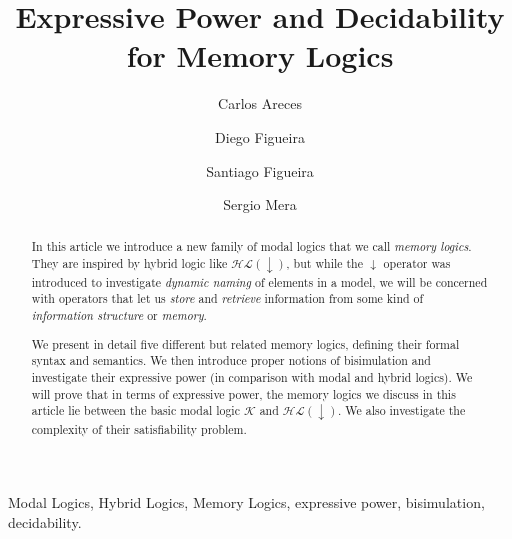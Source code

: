 \documentclass{elsarticle}
\newcommand{\down}{{\downarrow}}
\newcommand{\bml}{\K}
\newcommand{\HL}{\mathcal{HL}}
\newcommand{\K}{\mathcal{K}}
\begin{document}
\begin{frontmatter}
\title{Expressive Power and Decidability for Memory Logics}

\author[LORIA]       {Carlos Areces}
\author[CACHAN]      {Diego Figueira}
\author[UBA,CONICET] {Santiago Figueira}
\author[UBA]         {Sergio Mera}
\address[LORIA]      {INRIA Nancy Grand Est, France}
\address[CACHAN]     {LSV, ENS Cachan, CNRS, INRIA Saclay, France}
\address[UBA]        {Departamento de Computaci\'on, FCEyN\\Universidad de Buenos Aires, Argentina}
\address[CONICET]        {CONICET, Argentina}




\begin{abstract}
In this article we introduce a
new family of modal logics that we call \emph{memory logics}.  They
are inspired by hybrid logic like $\HL(\down)$, but while the
$\down$ operator was introduced to investigate \emph{dynamic naming}
of elements in a model, we will be concerned with operators that
let us \emph{store} and \emph{retrieve} information from some kind
of \emph{information structure} or \emph{memory}.

We present in detail five different but related memory logics,
defining their formal syntax and semantics. We then introduce
proper notions of bisimulation and investigate their expressive power
(in comparison with modal and hybrid logics). We will prove that in
terms of expressive power, the memory logics we discuss in this
article lie between the basic modal logic $\bml$ and $\HL(\down)$. We also
investigate the complexity of their satisfiability problem.
\end{abstract}

\begin{keyword}
Modal Logics, Hybrid Logics, Memory Logics, expressive power, bisimulation,
decidability.
\end{keyword}
\end{frontmatter}







%
%




\end{document}
